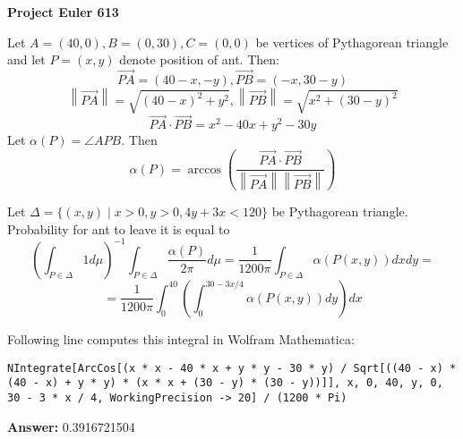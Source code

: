 \documentclass[a4paper,12pt]{article}
\renewcommand\vec[1]{\overrightarrow{#1}}
\newcommand\norm[1]{\left\lVert\vec{#1}\right\rVert}
\begin{document}
\setlength\parindent{0pt}
\textbf{Project Euler 613}
\vspace{5ex}

Let \(A = (40, 0), B = (0, 30), C = (0, 0)\) be vertices of Pythagorean triangle and let \(P = (x, y)\) denote position of ant. Then:
\[\vec{PA} = (40 - x, -y), \vec{PB} = (-x, 30 - y)\]
\[\norm{PA} = \sqrt{(40 - x)^2 + y^2}, \norm{PB} = \sqrt{x^2 + (30 - y)^2}\] \[\vec{PA} \cdot \vec{PB} = x^2 - 40 x + y^2 - 30 y\]
Let \(\alpha(P) = \angle APB\). Then
\[\alpha(P) = \arccos \left( \frac{\vec{PA} \cdot \vec{PB}}{\norm{PA} \norm{PB}} \right)\]

Let \(\Delta = \{(x, y) \mid x > 0, y > 0, 4y + 3x < 120\}\) be Pythagorean triangle. Probability for ant to leave it is equal to 
\[ \left(  \int_{P \in \Delta} 1 d\mu \right)^{-1} \int_{P \in \Delta} \frac{\alpha(P)}{2\pi} d\mu = \frac{1}{1200 \pi} \int_{P \in \Delta} \alpha(P(x, y)) dx dy =\]
\[= \frac{1}{1200 \pi} \int_0^{40} \left( \int_0^{30 - 3x/4} \alpha(P(x, y)) dy\right) dx\]

Following line computes this integral in Wolfram Mathematica:

\texttt{NIntegrate[ArcCos[(x * x - 40 * x + y * y - 30 * y) / Sqrt[((40 - x) * (40 - x) + y * y) * (x * x + (30 - y) * (30 - y))]], {x, 0, 40}, {y, 0, 30 - 3 * x / 4}, WorkingPrecision -> 20] / (1200 * Pi)}

\vspace{5ex}
\textbf{Answer:}
0.3916721504
\end{document}
